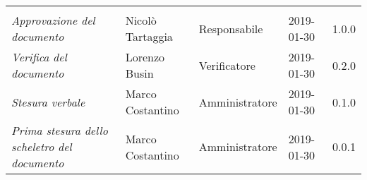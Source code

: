 \newpage 
\section*{}
\begin{table}[H]
	\centering
	\begin{tabular}{p{4cm}|C{3cm}|C{3cm}|R{2.5cm}|R{2cm}}
		
		 & & & & \\
		
		
		\emph{Approvazione del documento} & Nicolò Tartaggia & Responsabile & 2019-01-30 & 1.0.0 \\
		\hline
		
		\emph{Verifica del documento} & Lorenzo Busin & Verificatore & 2019-01-30 & 0.2.0 \\
		\hline


		\emph{Stesura verbale} & Marco Costantino & Amministratore & 2019-01-30 & 0.1.0 \\
		\hline
		
		\emph{Prima stesura dello scheletro del documento} & Marco Costantino & Amministratore & 2019-01-30 & 0.0.1 \\
		
	\end{tabular}
	
\end{table}


\clearpage